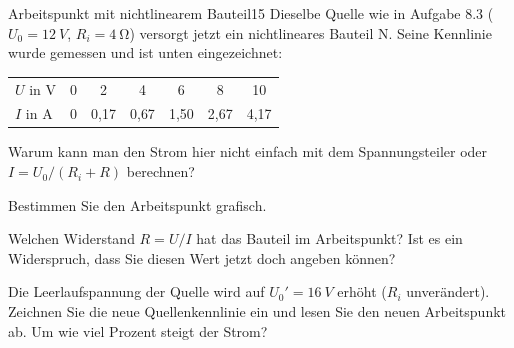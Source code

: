 \documentclass[11pt,a4paper]{article}
\begin{document}
\begin{aufgabe}{Arbeitspunkt mit nichtlinearem Bauteil}{15}
Dieselbe Quelle wie in Aufgabe 8.3 ($U_0 = \SI{12}{V}$, $R_i = \SI{4}{\ohm}$) versorgt jetzt ein nichtlineares Bauteil N. Seine Kennlinie wurde gemessen und ist unten eingezeichnet:
\begin{center}
\begin{tabular}{l*{6}{c}}
\toprule
$U$ in V & 0 & 2 & 4 & 6 & 8 & 10\\
$I$ in A & 0 & 0{,}17 & 0{,}67 & 1{,}50 & 2{,}67 & 4{,}17\\\bottomrule
\end{tabular}
\end{center}
\begin{teilaufgaben}
  \item Warum kann man den Strom hier nicht einfach mit dem Spannungsteiler oder $I = U_0/(R_i + R)$ berechnen?
  \item Bestimmen Sie den Arbeitspunkt grafisch.
  \item Welchen Widerstand $R = U/I$ hat das Bauteil im Arbeitspunkt? Ist es ein Widerspruch, dass Sie diesen Wert jetzt doch angeben können?
  \item Die Leerlaufspannung der Quelle wird auf $U_0' = \SI{16}{V}$ erhöht ($R_i$ unverändert). Zeichnen Sie die neue Quellenkennlinie ein und lesen Sie den neuen Arbeitspunkt ab. Um wie viel Prozent steigt der Strom?
\end{teilaufgaben}
\begin{center}
\end{center}
\end{aufgabe}
\end{document}
